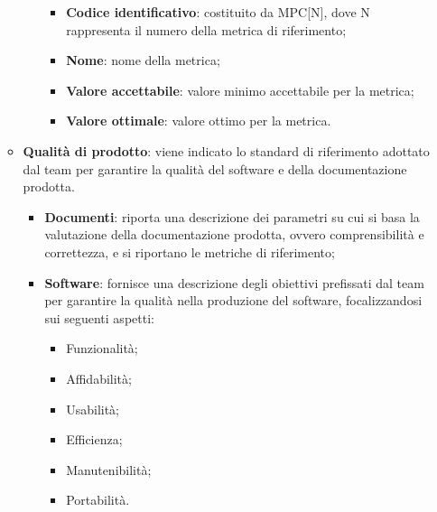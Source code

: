 \begin{itemize}
\begin{itemize}
\begin{itemize}
\begin{itemize}
                                                            \item \textbf{Codice identificativo}: costituito da MPC[N], dove N rappresenta il numero della metrica di riferimento;
                                                            \item \textbf{Nome}: nome della metrica;
                                                            \item \textbf{Valore accettabile}: valore minimo accettabile per la metrica;
                                                            \item \textbf{Valore ottimale}: valore ottimo per la metrica.
                                                        \end{itemize}
                                                    \end{itemize}
                                                    \item \textbf{Qualità di prodotto}: viene indicato lo standard di riferimento adottato dal team per garantire la qualità del software e della documentazione prodotta.
                                                    \begin{itemize}
                                                        \item \textbf{Documenti}: riporta una descrizione dei parametri su cui si basa la valutazione della documentazione prodotta, ovvero comprensibilità e correttezza, e si riportano le metriche di riferimento;
                                                        \item \textbf{Software}: fornisce una descrizione degli obiettivi prefissati dal team per garantire la qualità nella produzione del software, focalizzandosi sui seguenti aspetti:
                                                        \begin{itemize}
                                                            \item Funzionalità;
                                                            \item Affidabilità;
                                                            \item Usabilità;
                                                            \item Efficienza;
                                                            \item Manutenibilità;
                                                            \item Portabilità.

\end{itemize}
\end{itemize}
\end{itemize}
\end{itemize}
